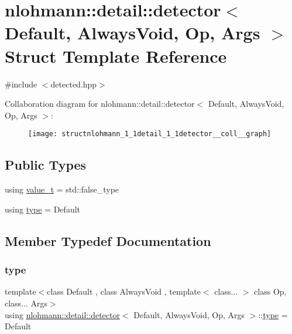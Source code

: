 \hypertarget{structnlohmann_1_1detail_1_1detector}{}\section{nlohmann\+:\+:detail\+:\+:detector$<$ Default, Always\+Void, Op, Args $>$ Struct Template Reference}
\label{structnlohmann_1_1detail_1_1detector}


{\ttfamily \#include $<$detected.\+hpp$>$}



Collaboration diagram for nlohmann\+:\+:detail\+:\+:detector$<$ Default, Always\+Void, Op, Args $>$\+:\nopagebreak
\begin{figure}[H]
\begin{center}
\leavevmode
\texttt{[image: structnlohmann\_1\_1detail\_1\_1detector\_\_coll\_\_graph]}
\end{center}
\end{figure}
\subsection*{Public Types}
\begin{DoxyCompactItemize}
\item 
using \hyperlink{structnlohmann_1_1detail_1_1detector_a5a132aab543d1706e2439268faf8d487}{value\+\_\+t} = std\+::false\+\_\+type
\item 
using \hyperlink{structnlohmann_1_1detail_1_1detector_a0cd69423587748bf3d3d702cc7b7c2ce}{type} = Default
\end{DoxyCompactItemize}


\subsection{Member Typedef Documentation}
\mbox{\label{structnlohmann_1_1detail_1_1detector_a0cd69423587748bf3d3d702cc7b7c2ce}} 
\subsubsection{\texorpdfstring{type}{type}}
{\footnotesize\ttfamily template$<$class Default , class Always\+Void , template$<$ class... $>$ class Op, class... Args$>$ \\
using \hyperlink{structnlohmann_1_1detail_1_1detector}{nlohmann\+::detail\+::detector}$<$ Default, Always\+Void, Op, Args $>$\+::\hyperlink{structnlohmann_1_1detail_1_1detector_a0cd69423587748bf3d3d702cc7b7c2ce}{type} =  Default}

